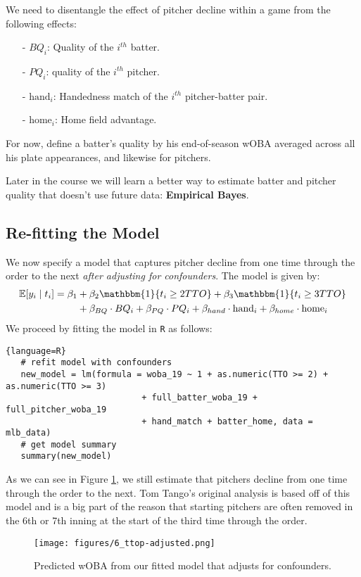 \documentclass[twoside]{article}
\theoremstyle{definition}
\begin{document}
We need to disentangle the effect of \color{blue} pitcher decline within a game \color{black} from the following effects:
\begin{itemize}
    \item[-] $BQ_i$: Quality of the $i^{th}$ batter.
    \item[-] $PQ_i$: quality of the $i^{th}$ pitcher.
    \item[-] $\text{hand}_i$: Handedness match of the $i^{th}$ pitcher-batter pair.
    \item[-] $\text{home}_i$: Home field advantage.
\end{itemize}
For now, define a batter's quality by his end-of-season wOBA averaged across all his plate appearances, and likewise for pitchers.

Later in the course we will learn a better way to estimate batter and pitcher quality that doesn't use future data: \textbf{Empirical Bayes}.

\subsection{Re-fitting the Model}

We now specify a model that captures pitcher decline from one time through the order to the next \textit{after adjusting for confounders}. The model is given by:
\begin{align}
   \mathbb{E}[y_i \mid t_i] = \beta_1 &+ \beta_2 \mathbbm{1}\{t_i \geq 2TTO \} + \beta_3 \mathbbm{1}\{t_i \geq 3TTO\} \\
   &+ \beta_{BQ} \cdot BQ_i + \beta_{PQ} \cdot PQ_i + \beta_{hand} \cdot \text{hand}_i + \beta_{home} \cdot \text{home}_i \nonumber
\end{align}
We proceed by fitting the model in \texttt{R} as follows:
\begin{lstlisting}{language=R}
   # refit model with confounders
   new_model = lm(formula = woba_19 ~ 1 + as.numeric(TTO >= 2) + as.numeric(TTO >= 3)
                           + full_batter_woba_19 + full_pitcher_woba_19
                           + hand_match + batter_home, data = mlb_data)
   # get model summary
   summary(new_model)
\end{lstlisting}
As we can see in Figure \ref{fig:ttop-adjusted}, we still estimate that pitchers decline from one time through the order to the next. Tom Tango's original analysis is based off of this model and is a big part of the reason that starting pitchers are often removed in the 6th or 7th inning at the start of the third time through the order.
\begin{figure}[H]
   \centering
   \texttt{[image: figures/6\_ttop-adjusted.png]}
   \caption{Predicted wOBA from our fitted model that adjusts for confounders.}
   \label{fig:ttop-adjusted}
\end{figure}
\end{document}
